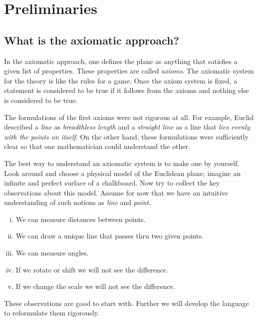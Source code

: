 \chapter{Preliminaries}\label{chap:metr}

\section*{What is the axiomatic approach?}

In the axiomatic approach, one defines the plane as anything that satisfies a given list of properties.
These properties are called {}\emph{axioms}.
The axiomatic system for the theory 
is like the rules for a game.
Once the axiom system is fixed, a statement is considered to be true if it follows from the axioms and nothing else is considered to be true.

The formulations of the first axioms were not rigorous at all.
For example, Euclid described a {}\emph{line} as {}\emph{breadthless length}
and a {}\emph{straight line} as a line that {}\emph{lies evenly with the points on itself}.
On the other hand,
these formulations were sufficiently clear 
so that one mathematician could understand the other.

The best way to understand an axiomatic system
is to make one by yourself.
Look around and choose a physical model 
of the Euclidean plane;
imagine an infinite and perfect surface of a chalkboard. 
Now try to collect the key observations
about this model.
Assume for now that we have an intuitive understanding of such notions as {}\emph{line} and {}\emph{point}.
\begin{enumerate}[(i)]
 \item\label{preaxiomI} We can measure distances between points.
 \item\label{preaxiomII} We can draw a unique line 
 that passes thru two given points.
 \item\label{preaxiomIII} We can measure angles.
 \item\label{preaxiomIV} If we rotate or shift we will not see the difference.
 \item\label{preaxiomV} If we change the scale we will not see the difference.
\end{enumerate}
These observations are good to start with.
Further we will develop the language to reformulate them rigorously.

